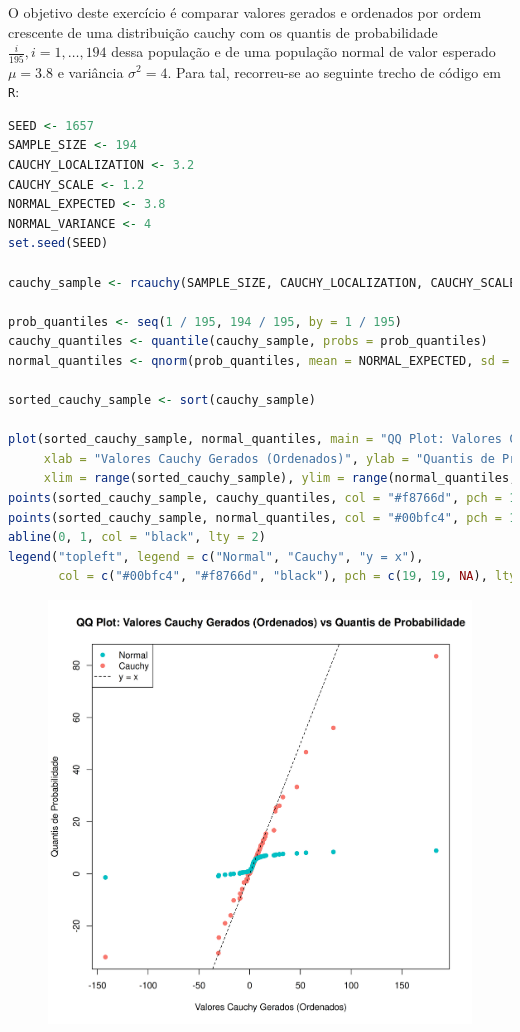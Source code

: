 \documentclass[12pt,a4paper]{article}
\begin{document}
O objetivo deste exercício é comparar valores gerados e ordenados por ordem crescente de uma distribuição cauchy com os
quantis de probabilidade $\frac{i}{195}, i = 1,\ldots,194$ dessa população e de uma população normal de valor esperado
$\mu = 3.8$ e variância $\sigma^{2} = 4$.
Para tal, recorreu-se ao seguinte trecho de código em \texttt{R}:

\quad

\begin{lstlisting}[language=R]
SEED <- 1657
SAMPLE_SIZE <- 194
CAUCHY_LOCALIZATION <- 3.2
CAUCHY_SCALE <- 1.2
NORMAL_EXPECTED <- 3.8
NORMAL_VARIANCE <- 4
set.seed(SEED)

cauchy_sample <- rcauchy(SAMPLE_SIZE, CAUCHY_LOCALIZATION, CAUCHY_SCALE)

prob_quantiles <- seq(1 / 195, 194 / 195, by = 1 / 195)
cauchy_quantiles <- quantile(cauchy_sample, probs = prob_quantiles)
normal_quantiles <- qnorm(prob_quantiles, mean = NORMAL_EXPECTED, sd = sqrt(NORMAL_VARIANCE))

sorted_cauchy_sample <- sort(cauchy_sample)

plot(sorted_cauchy_sample, normal_quantiles, main = "QQ Plot: Valores Cauchy Gerados (Ordenados) vs Quantis de Probabilidade",
     xlab = "Valores Cauchy Gerados (Ordenados)", ylab = "Quantis de Probabilidade",
     xlim = range(sorted_cauchy_sample), ylim = range(normal_quantiles, cauchy_quantiles))
points(sorted_cauchy_sample, cauchy_quantiles, col = "#f8766d", pch = 19)
points(sorted_cauchy_sample, normal_quantiles, col = "#00bfc4", pch = 19)
abline(0, 1, col = "black", lty = 2)
legend("topleft", legend = c("Normal", "Cauchy", "y = x"),
       col = c("#00bfc4", "#f8766d", "black"), pch = c(19, 19, NA), lty = c(NA, NA, 2))
\end{lstlisting}

\quad

\begin{figure}[h]
  \centering
  \includegraphics[scale = 0.77]{./ex08.png}
\end{figure}
\end{document}
